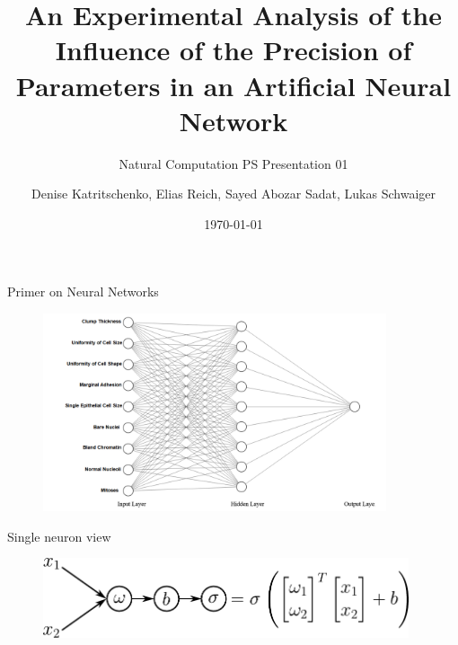 \documentclass[aspectratio=169]{beamer} %
\title{An Experimental Analysis of the Influence of the Precision of Parameters in an Artificial Neural Network}
\subtitle{Natural Computation PS Presentation 01}
\author[D. K., E. R., S. A. S., L. S.]{Denise Katritschenko, Elias Reich, Sayed Abozar Sadat, Lukas Schwaiger}
\institute[\plusshort]{\pluslong\\ Department of Artificial Intelligence and Human Interfaces (AIHI)}
\date[\today]{\today}
\begin{document}
\frame{\titlepage}



\begin{frame}{Primer on Neural Networks}
  \begin{figure}
    \includegraphics[width=0.9\textwidth]{figures/mlp.png}
  \end{figure}
\end{frame}

\begin{frame}{Single neuron view}
  \begin{figure}
    \includegraphics[width=0.96\textwidth]{figures/single-neuron.pdf}
  \end{figure}
\end{frame}
\end{document}
